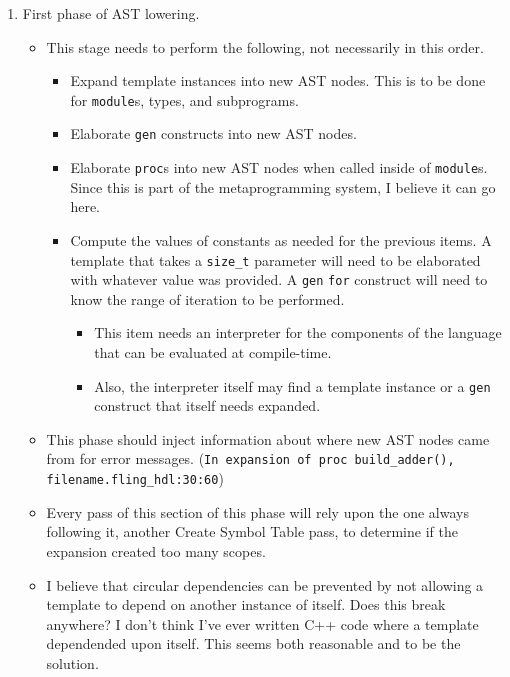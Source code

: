 \documentclass{article}
\begin{document}
\begin{enumerate}
\begin{itemize}
		\end{itemize}
	\item First phase of AST lowering.
		\begin{itemize}
		\item This stage needs to perform the following, not necessarily in
		this order.
			\begin{itemize}
			\item Expand template instances into new AST nodes.  This is to
			be done for \texttt{module}s, types, and subprograms.
			\item Elaborate \texttt{gen} constructs into new AST nodes.
			\item Elaborate \texttt{proc}s into new AST nodes when called
			inside of \texttt{module}s.  Since this is part of the
			metaprogramming system, I believe it can go here.
			\item Compute the values of constants as needed for the
			previous items.  A template that takes a \texttt{size\_t}
			parameter will need to be elaborated with whatever value was
			provided.  A \texttt{gen} \texttt{for} construct will need to
			know the range of iteration to be performed.
				\begin{itemize}
				\item This item needs an interpreter for the components of
				the language that can be evaluated at compile-time.
				\item Also, the interpreter itself may find a template
				instance or a \texttt{gen} construct that itself needs
				expanded.
				\end{itemize}
			\end{itemize}
		\item This phase should inject information about where new AST
		nodes came from for error messages.  (\texttt{In
		expansion of proc build\_adder(), filename.fling\_hdl:30:60})
		\item Every pass of this section of this phase will rely upon the
		one always following it, another Create Symbol Table pass, to
		determine if the expansion created too many scopes.  
		\item I believe that circular dependencies can be prevented by not
		allowing a template to depend on another instance of itself.  Does
		this break anywhere?  I don't think I've ever written C++ code
		where a template dependended upon itself.  This seems both
		reasonable and to be the solution.
			\begin{itemize}

\end{itemize}
\end{itemize}
\end{enumerate}
\end{document}
